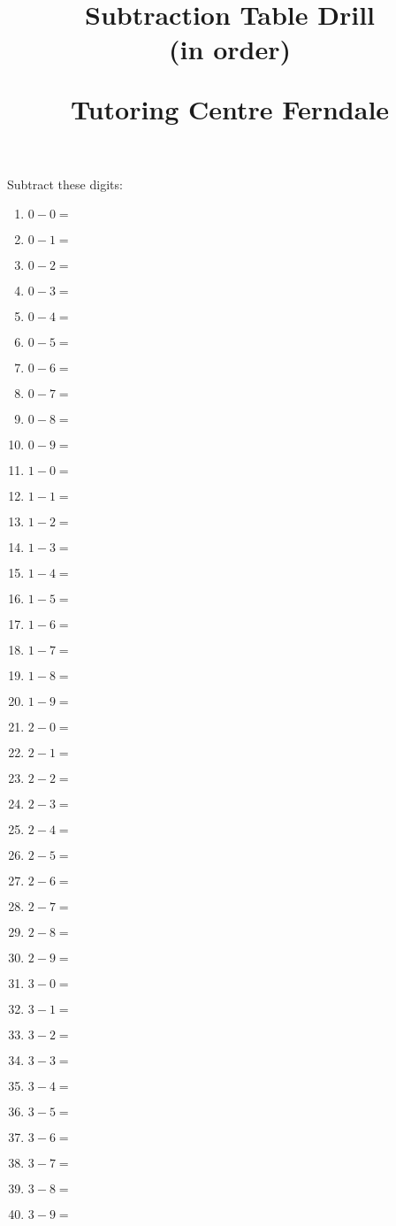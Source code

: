 \documentclass{article}
\title{Subtraction Table Drill\\(in order)\\
\begin{normalsize}
Tutoring Centre Ferndale
\end{normalsize}}
\author{}
\date{}
\begin{document}
\maketitle

\noindent Subtract these digits:

\begin{multicols}{5}
\begin{enumerate}

\item $0 - 0 =$
\item $0 - 1 =$
\item $0 - 2 =$
\item $0 - 3 =$
\item $0 - 4 =$
\item $0 - 5 =$
\item $0 - 6 =$
\item $0 - 7 =$
\item $0 - 8 =$
\item $0 - 9 =$

\item $1 - 0 =$
\item $1 - 1 =$
\item $1 - 2 =$
\item $1 - 3 =$
\item $1 - 4 =$
\item $1 - 5 =$
\item $1 - 6 =$
\item $1 - 7 =$
\item $1 - 8 =$
\item $1 - 9 =$

\item $2 - 0 =$
\item $2 - 1 =$
\item $2 - 2 =$
\item $2 - 3 =$
\item $2 - 4 =$
\item $2 - 5 =$
\item $2 - 6 =$
\item $2 - 7 =$
\item $2 - 8 =$
\item $2 - 9 =$

\item $3 - 0 =$
\item $3 - 1 =$
\item $3 - 2 =$
\item $3 - 3 =$
\item $3 - 4 =$
\item $3 - 5 =$
\item $3 - 6 =$
\item $3 - 7 =$
\item $3 - 8 =$
\item $3 - 9 =$


\end{enumerate}
\end{multicols}
\end{document}

